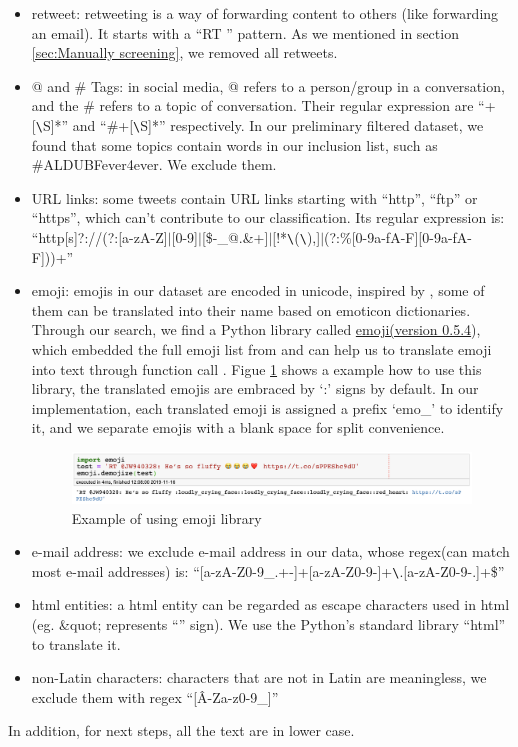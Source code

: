     \begin{itemize}
        \item retweet: retweeting is a way of forwarding content to others (like forwarding an email). It starts with a ``RT \@'' pattern. As we mentioned in section \ref{sec:Manually screening}, we removed all retweets.
        \item @ and \# Tags: in social media, @ refers to a person/group in a conversation, and the \# refers to a topic of conversation. Their regular expression are ``\@+[\verb|\|S]*'' and ``\#+[\verb|\|S]*'' respectively. In our preliminary filtered dataset, we found that some topics contain words in our inclusion list, such as \#ALDUBFever4ever. We exclude them. 
        \item URL links: some tweets contain URL links starting with ``http'', ``ftp'' or ``https'', which can't contribute to our classification. Its regular expression is:\\``http[s]?://(?:[a-zA-Z]$|$[0-9]$|$[\$-\_@.\&+]$|$[!*\verb|\|(\verb|\|),]$|$(?:\%[0-9a-fA-F][0-9a-fA-F]))+''
        \item emoji: emojis in our dataset are encoded in unicode, inspired by \cite{serban2019real}, some of them can be translated into their name based on emoticon dictionaries. Through our search, we find a Python library called \href{https://pypi.org/project/emoji/} {emoji(version 0.5.4}), which embedded the full emoji list from \cite{emo_list} and can help us to translate emoji into text through function call \cite{pytho_emo}. Figue \ref{fig:emo_lib} shows a example how to use this library, the translated emojis are embraced by `:' signs by default. In our implementation, each translated emoji is assigned a prefix `emo\_' to identify it, and we separate emojis with a blank space for split convenience.
        \begin{figure}[!htbp]
            \centering
            \includegraphics[width=5in]{images/emoji_lib.png}
            \caption{Example of using emoji library}
            \label{fig:emo_lib}
        \end{figure}
        \item e-mail address: we exclude e-mail address in our data, whose regex(can match most e-mail addresses) is:
        ``[a-zA-Z0-9\_.+-]+\@[a-zA-Z0-9-]+\verb|\|.[a-zA-Z0-9-.]+\$''
        \item html entities: a html entity can be regarded as escape characters used in html (eg. \&quot; represents ``'' sign). We use the Python's standard library ``html'' to translate it.
        \item non-Latin characters: characters that are not in Latin are meaningless, we exclude them with regex ``[\^A-Za-z0-9\_]'' 
    \end{itemize}
    In addition, for next steps, all the text are in lower case.

